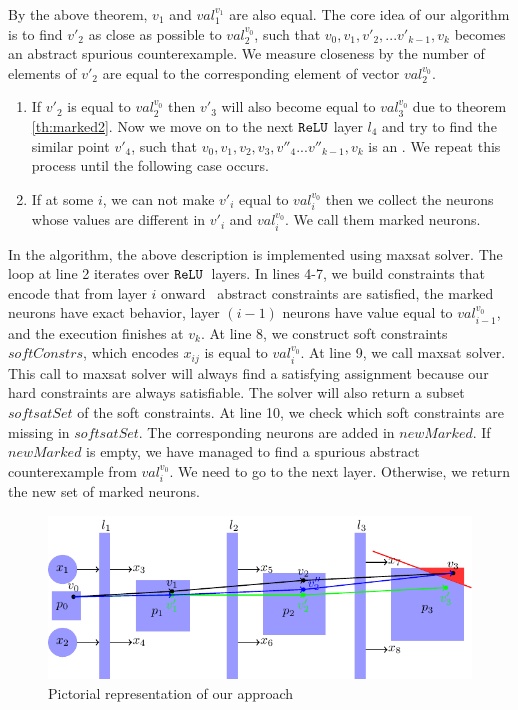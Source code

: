 By the above theorem, ${v_1}$ and ${val_1^{v_1}}$ are also equal. 
The core idea of our algorithm is to find ${v'_2}$ as close as possible to ${val_2^{v_0}}$, 
such that ${v_0}, {v_1}, {v'_2}, ... {v'_{k-1}}, {v_k}$ becomes an abstract spurious counterexample. 
We measure closeness by the number of elements of ${v'_2}$ are equal to the 
corresponding element of vector ${val_2^{v_0}}$.
\begin{enumerate}
\item If ${v'_2}$ is equal to ${val_2^{v_0}}$ then ${v'_3}$ will also become 
  equal to ${val_3^{v_0}}$ due to theorem \ref{th:marked2}. 
  Now we move on to the next $\texttt{ReLU}${} layer $l_4$ and try to find the similar point ${v'_4}$, such that 
  ${v_0}, {v_1}, {v_2}, {v_3},{v''_4}... {v''_{k-1}},{v_k}$ is an . 
  We repeat this process until the following case occurs. 
\item If at some $i$, we can not make ${v'_i}$ equal to ${val_i^{v_0}}$ then we collect the neurons
  whose values are different in ${v'_i}$ and ${val_i^{v_0}}$. We call them marked neurons.
\end{enumerate}

In the algorithm, the above description is implemented using maxsat solver.
The loop at line 2 iterates over $\texttt{ReLU}${}~layers.
In lines 4-7, we build constraints that encode that from layer $i$ onward
\deeppoly~abstract constraints are satisfied,
the marked neurons have exact behavior, layer $(i-1)$ neurons have value equal to
${val_{i-1}^{v_0}}$, and the execution finishes at $v_k$.
At line 8, we construct soft constraints $softConstrs$, which encodes $x_{ij}$ is equal to $val_{i}^{v_0}$.
At line 9, we call maxsat solver. 
This call to maxsat solver will always find a satisfying assignment because
our hard constraints are always satisfiable.
The solver will also return a subset $softsatSet$ of the soft constraints.
At line 10, we check which soft constraints are missing in $softsatSet$.
The corresponding neurons are added in $newMarked$.
If $newMarked$ is empty, we have managed to find a spurious
abstract counterexample from $val^{v_0}_{i}$.
We need to go to the next layer.
Otherwise, we return the new set of marked neurons.

\begin{figure}
  \centering
  \includegraphics[scale=0.55]{fig/pictorial2.pdf}
  \caption{Pictorial representation of our approach}
  \label{fig:pictorial}
\end{figure}

